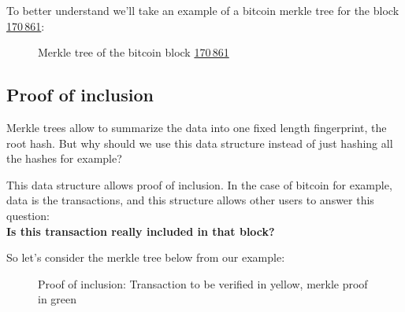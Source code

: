 To better understand we'll take an example of a bitcoin merkle tree for the block \href{https://www.blockchain.com/explorer/fr/explorer/blocks/btc/000000000000030de89e7729d5785c4730839b6e16ea9fb686a54818d3860a8d}{170 861}:

\begin{figure}[H]
    \centering
{}
    \caption{Merkle tree of the bitcoin block \href{https://blockchair.com/bitcoin/block/170861}{170 861}}
    \label{fig:merkletree}
\end{figure}

\subsection{Proof of inclusion} \label{merkle:inclusion}

Merkle trees allow to summarize the data into one fixed length fingerprint, the root hash. 
But why should we use this data structure instead of just hashing all the hashes for example?

This data structure allows proof of inclusion. In the case of bitcoin for example, data is the transactions, and this structure allows other users to answer this question: \\
\textbf{Is this transaction really included in that block?}

So let's consider the merkle tree below from our example:


\begin{figure}[H]
    \centering
{}
    \caption{Proof of inclusion: Transaction to be verified in yellow, merkle proof in green}
    \label{fig:merkleproof}
\end{figure}


